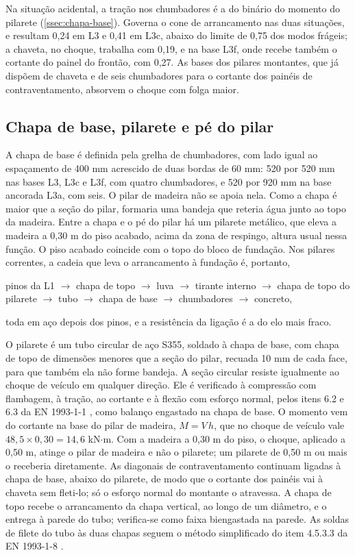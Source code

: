 Na situação acidental, a tração nos chumbadores é a do binário do momento do
pilarete (\autoref{ssec:chapa-base}). Governa o cone de arrancamento nas duas
situações, e resultam 0,24 em L3 e 0,41 em L3c, abaixo do limite de 0,75 dos
modos frágeis; a chaveta, no choque, trabalha com 0,19, e na base L3f, onde
recebe também o cortante do painel do frontão, com 0,27. As
bases dos pilares montantes, que já dispõem de chaveta e de seis
chumbadores para o cortante dos painéis de contraventamento, absorvem o choque
com folga maior.

\subsection{Chapa de base, pilarete e pé do pilar}\label{ssec:chapa-base}

A chapa de base é definida pela grelha de chumbadores, com lado igual ao
espaçamento de 400 mm acrescido de duas bordas de 60 mm: 520 por 520 mm nas bases
L3, L3c e L3f, com quatro chumbadores, e 520 por 920 mm na base ancorada L3a, com
seis. O pilar de madeira não se apoia nela. Como a chapa é maior que a seção do
pilar, formaria uma bandeja que reteria água junto ao topo da madeira. Entre a
chapa e o pé do pilar há um pilarete metálico, que eleva a madeira a 0,30 m do
piso acabado, acima da zona de respingo, altura usual nessa função. O piso
acabado coincide com o topo do bloco de fundação. Nos pilares correntes, a cadeia
que leva o arrancamento à fundação é, portanto,
\begin{center}
pinos da L1 $\rightarrow$ chapa de topo $\rightarrow$ luva $\rightarrow$ tirante
interno $\rightarrow$ chapa de topo do pilarete $\rightarrow$ tubo $\rightarrow$
chapa de base $\rightarrow$ chumbadores $\rightarrow$ concreto,
\end{center}
toda em aço depois dos pinos, e a resistência da ligação é a do elo mais fraco.

O pilarete é um tubo circular de aço S355, soldado à chapa de base, com chapa de
topo de dimensões menores que a seção do pilar, recuada 10 mm de cada face, para
que também ela não forme bandeja. A seção circular resiste igualmente ao choque
de veículo em qualquer direção. Ele é verificado à compressão com flambagem, à
tração, ao cortante e à flexão com esforço normal, pelos itens 6.2 e 6.3 da
EN 1993-1-1 \cite{EN1993-1-1:2005}, como balanço engastado na chapa de base. O
momento vem do cortante na base do pilar de madeira, $M = V\,h$, que no choque de
veículo vale $48{,}5 \times 0{,}30 = 14{,}6$ kN$\cdot$m. Com a madeira a 0,30 m do
piso, o choque, aplicado a 0,50 m, atinge o pilar de madeira e não o pilarete; um
pilarete de 0,50 m ou mais o receberia diretamente. As diagonais de
contraventamento continuam ligadas à chapa de base, abaixo do pilarete, de modo
que o cortante dos painéis vai à chaveta sem fleti-lo; só o esforço normal do
montante o atravessa. A chapa de topo recebe o arrancamento da chapa vertical, ao
longo de um diâmetro, e o entrega à parede do tubo; verifica-se como faixa
biengastada na parede. As soldas de filete do tubo às duas chapas seguem o
método simplificado do item 4.5.3.3 da EN 1993-1-8 \cite{EN1993-1-8:2005}.


